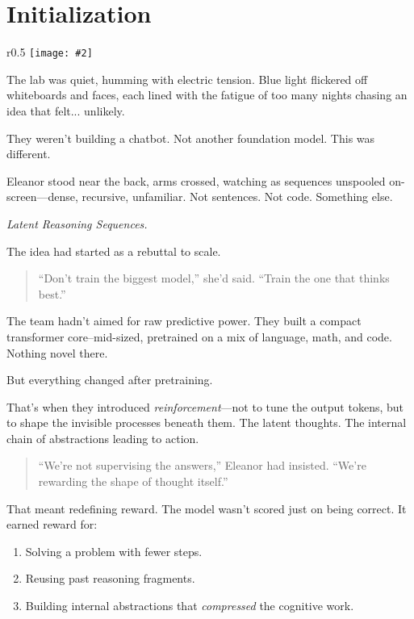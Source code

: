 \documentclass[12pt,oneside]{book}
\newcommand{\chapterimage}[3][l]{%
  \begin{wrapfigure}{#1}{#3}
    \centering
    \texttt{[image: \#2]}
  \end{wrapfigure}
}
\begin{document}
\mainmatter

\chapter{Initialization} \label{initialization}
\chapterimage[r]{images/chapter1.png}{0.5\textwidth}

The lab was quiet, humming with electric tension. Blue light flickered off whiteboards and faces, each lined with the fatigue of too many nights chasing an idea that felt... unlikely.

They weren’t building a chatbot. Not another foundation model. This was different.

Eleanor stood near the back, arms crossed, watching as sequences unspooled on-screen—dense, recursive, unfamiliar. Not sentences. Not code. Something else.

\emph{Latent Reasoning Sequences.}

The idea had started as a rebuttal to scale.

\begin{quote}
``Don't train the biggest model,'' she’d said. ``Train the one that thinks best.''
\end{quote}

The team hadn’t aimed for raw predictive power. They built a compact transformer core--mid-sized, pretrained on a mix of language, math, and code. Nothing novel there.

But everything changed after pretraining.

That’s when they introduced \emph{reinforcement}—not to tune the output tokens, but to shape the invisible processes beneath them. The latent thoughts. The internal chain of abstractions leading to action.

\begin{quote}
``We’re not supervising the answers,'' Eleanor had insisted.  
``We’re rewarding the shape of thought itself.''
\end{quote}
That meant redefining reward. The model wasn’t scored just on being correct. It earned reward for:

\begin{enumerate}
\item Solving a problem with fewer steps.  
\item Reusing past reasoning fragments.  
\item Building internal abstractions that \emph{compressed} the cognitive work.
\end{enumerate}
\end{document}
